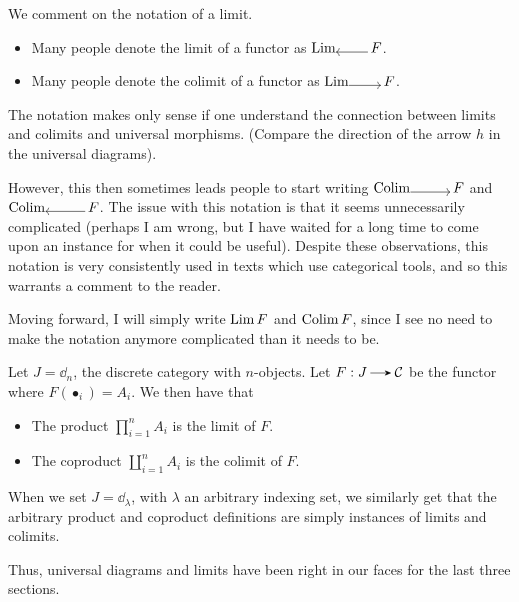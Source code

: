     \begin{remark}
        We comment on the notation of a limit. 
        \begin{itemize}
            \item Many people denote the limit of a functor as $\Limfrom F$. 
            \item Many people denote the colimit of a functor as $\Limto F$. 
        \end{itemize}
        The notation makes only sense if one understand the connection between limits and colimits and  
        universal morphisms. (Compare the direction of the arrow $h$ in the universal diagrams).

        However, this then sometimes leads people to start writing $\Colimto F$ and $\Colimfrom F$. 
        The issue with this notation is that it seems unnecessarily complicated (perhaps I am wrong, 
        but I have waited for a long time 
        to come upon an instance for when it could be useful). 
        Despite these observations, this 
        notation is very consistently used in texts which use categorical tools, and so this 
        warrants a comment to the reader.

        Moving forward, I will simply write  $\operatorname*{\mathrm{Lim }} F$ and $\operatorname*{\mathrm{Colim }} F$, since I see no need to make 
        the notation anymore complicated than it needs to be. 
    \end{remark}
    
    \begin{example}
        Let $J = \dd_n$, the discrete category with $n$-objects. Let $F: J \to \cc$ be 
        the functor where $F(\bullet_i) = A_i$. We then have that 
        \begin{itemize}
            \item The product $\prod_{i = 1}^{n}A_i$ is the limit of $F$. 
            \item The coproduct $\coprod_{i = 1}^{n}A_i$ is the colimit of $F$. 
        \end{itemize}
        When we set $J = \dd_{\lambda}$, with $\lambda$ an arbitrary indexing set, we similarly get 
        that the arbitrary product and coproduct definitions are simply instances of 
        limits and colimits. 

        Thus, universal diagrams and limits have been right in our faces for the last three sections. 
    \end{example}

